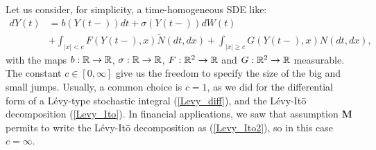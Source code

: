 Let us consider, for simplicity, a time-homogeneous SDE like:
\begin{align} \label{SDE}
 dY(t) &= b(Y(t-)) dt  + \sigma(Y(t-)) dW(t)\\ \nonumber
     &+ \int_{|x|<c} F(Y(t-),x) \tilde N (dt,dx) + \int_{|x|\geq c} G(Y(t-),x) N(dt,dx),
\end{align}
with the maps $b:\mathbb{R} \to \mathbb{R}$, $\sigma:\mathbb{R} \to \mathbb{R}$, $F:\mathbb{R}^2 \to \mathbb{R}$ and $G:\mathbb{R}^2 \to \mathbb{R}$ 
measurable. 
The constant $c \in [0,\infty]$ give us the freedom to specify the size of the big and small jumps.
Usually, a common choice is $c=1$, as we did for the differential form of a Lévy-type stochastic integral (\ref{Levy_diff}), and 
the Lévy-It\={o} decomposition (\ref{Levy_Ito}).
In financial applications, we saw that assumption \textbf{M} permits to write the Lévy-It\={o} decomposition as 
(\ref{Levy_Ito2}), so in this case $c=\infty$.


